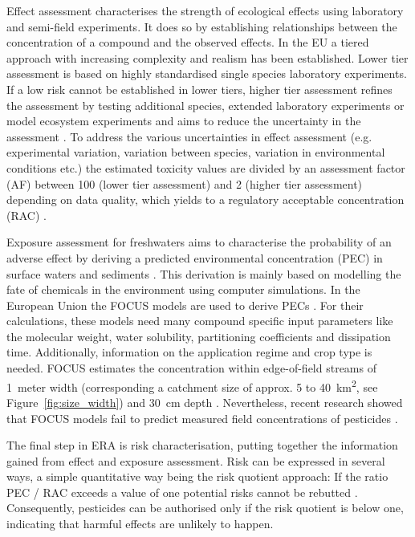Effect assessment characterises the strength of ecological effects using laboratory and semi-field experiments.
It does so by establishing relationships between the concentration of a compound and the observed effects.
In the EU a tiered approach with increasing complexity and realism has been established.
Lower tier assessment is based on highly standardised single species laboratory experiments.
If a low risk cannot be established in lower tiers, higher tier assessment refines the assessment by testing additional species, extended laboratory experiments or model ecosystem experiments and aims to reduce the uncertainty in the assessment \citep{efsa_guidance_2013, brock_aquatic_2006}. 
To address the various uncertainties in effect assessment (e.g. experimental variation, variation between species, variation in environmental conditions etc.) the estimated toxicity values are divided by an assessment factor (AF) between 100 (lower tier assessment) and 2 (higher tier assessment) depending on data quality, which yields to a regulatory acceptable concentration (RAC) \citep{efsa_guidance_2013, brock_aquatic_2006}. 

Exposure assessment for freshwaters aims to characterise the probability of an adverse effect by deriving a predicted environmental concentration (PEC) in surface waters and sediments \citep{newman_fundamentals_2015}. 
This derivation is mainly based on modelling the fate of chemicals in the environment using computer simulations. 
In the European Union the FOCUS models are used to derive PECs \citep{focus_focus_2001, efsa_guidance_2013}.
For their calculations, these models need many compound specific input parameters like the molecular weight, water solubility, partitioning coefficients and dissipation time. 
Additionally, information on the application regime and crop type is needed. 
FOCUS estimates the concentration within edge-of-field streams of 1~meter width (corresponding a catchment size of approx. 5 to 40~km\textsuperscript{2}, see Figure~\ref{fig:size_width}) and 30~cm depth \citep{erlacher_regulation_2011}. 
Nevertheless, recent research showed that FOCUS models fail to predict measured field concentrations of pesticides \citep{knabel_regulatory_2012, knabel_fungicide_2014}. 

The final step in ERA is risk characterisation, putting together the information gained from effect and exposure assessment. 
Risk can be expressed in several ways, a simple quantitative way being the risk quotient approach: If the ratio PEC / RAC exceeds a value of one potential risks cannot be rebutted \citep{efsa_guidance_2013, suter_ecological_2007,  solomon_probabilistic_2000}. 
Consequently, pesticides can be authorised only if the risk quotient is below one, indicating that harmful effects are unlikely to happen.



